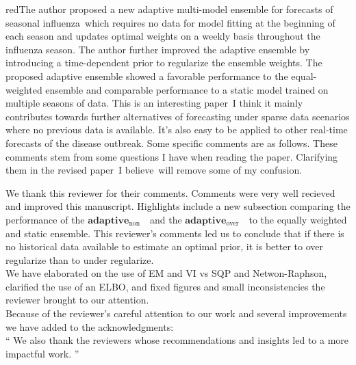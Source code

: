 \documentclass[
  fontsize=11pt,
  paper=a4,
  parskip=half,
  enlargefirstpage=on,    %
  fromalign=right,        %
  fromphone=on,           %
  fromrule=aftername,     %
  addrfield=on,           %
  backaddress=on,         %
  subject=beforeopening,  %
  locfield=narrow,        %
  foldmarks=on,           %
]{scrlttr2}
\def\adaptNon{\textbf{adaptive$_{\text{non}}$ }}
\def\adaptOver{\textbf{adaptive$_{\text{over}}$ }}
\begin{document}
    \begin{commt}{red}{The author proposed a new adaptive multi-model ensemble for forecasts of seasonal influenza\, which requires no data for model fitting at the beginning of each season and updates optimal weights on a weekly basis throughout the influenza season. The author further improved the adaptive ensemble by introducing a time-dependent prior to regularize the ensemble weights. The proposed adaptive ensemble showed a favorable performance to the equal-weighted ensemble and comparable performance to a static model trained on multiple seasons of data. This is an interesting paper\, I think it mainly contributes towards further alternatives of forecasting under sparse data scenarios where no previous data is available. It’s also easy to be applied to other real-time forecasts of the disease outbreak. Some specific comments are as follows. These comments stem from some questions I have when reading the paper. Clarifying them in the revised paper\, I believe\, will remove some of my confusion.}

      We thank this reviewer for their comments.
      Comments were very well recieved and improved this manuscript.
      Highlights include a new subsection comparing the performance of the {$\adaptNon$} and the {$\adaptOver$} to the equally weighted and static ensemble.
      This reviewer's comments led us to conclude that if there is no historical data available to estimate an optimal prior, it is better to over regularize than to under regularize.\\ 

      We have elaborated on the use of EM and VI vs SQP and Netwon-Raphson, clarified the use of an ELBO, and fixed figures and small inconsistencies the reviewer brought to our attention.\\

      Because of the reviewer's careful attention to our work and several improvements we have added to the acknowledgments:\\

      ``
      We also thank the reviewers whose recommendations and insights led to a more impactful work.
      ''
      
    \end{commt}
\end{document}
